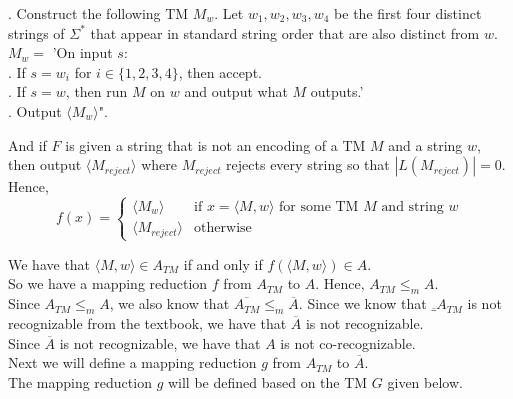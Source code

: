 \documentclass[12pt]{article}
\begin{document}
\setlength\parindent{15pt}

. Construct the following TM $M_w$. Let $w_1,w_2,w_3,w_4$ be the first four distinct strings of $\Sigma^*$ that appear in standard string order that are also distinct from $w$. \\
\indent \indent $M_w = $ 'On input $s$: \\
\indent \indent {}. If $s = w_i$ for $i \in \{1,2,3,4\}$, then accept. \\
\indent \indent {}. If $s = w$, then run $M$ on $w$ and output what $M$ outputs.' \\

. Output $\langle M_w \rangle$". \\

\setlength\parindent{0pt}

And if $F$ is given a string that is not an encoding of a TM $M$ and a string $w$, then output $\langle M_{reject} \rangle$ where $M_{reject}$ rejects every string so that $|L(M_{reject})| = 0$. \\

Hence, 
\[
  f(x) =
  \begin{cases}
        \langle M_w \rangle & \text{if $x = \langle M, w \rangle$ for some TM $M$ and string $w$} \\
        \langle M_{reject} \rangle & \text{otherwise} 
  \end{cases}
\]

We have that $\langle M, w \rangle \in A_{TM}$ if and only if $f(\langle M, w \rangle) \in A$. \\

So we have a mapping reduction $f$ from $A_{TM}$ to $A$. Hence, $A_{TM} \leq_m A$. \\

Since $A_{TM} \leq_m A$, we also know that $\overline{A_{TM}} \leq_m \overline{A}$. Since we know that $\overline_{A_{TM}}$ is not recognizable from the textbook, we have that $\overline{A}$ is not recognizable. \\

Since $\overline{A}$ is not recognizable, we have that $A$ is not co-recognizable. \\

Next we will define a mapping reduction $g$ from $A_{TM}$ to $\overline{A}$. \\

The mapping reduction $g$ will be defined based on the TM $G$ given below. \\
\end{document}
